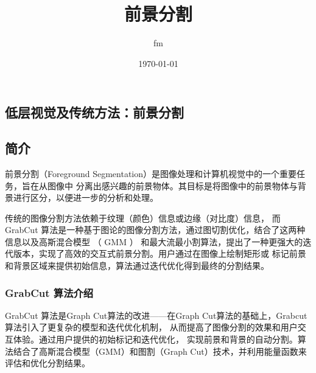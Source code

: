 \documentclass[12pt,a4paper]{article}
\date{\today}
\title{前景分割}
\author{fm}
\begin{document}
\begin{CJK}{UTF8}{gbsn}
\begin{sloppypar}
\maketitle
\section{低层视觉及传统方法：前景分割}
\subsection{简介}
前景分割（Foreground Segmentation）是图像处理和计算机视觉中的一个重要任务，旨在从图像中
分离出感兴趣的前景物体。其目标是将图像中的前景物体与背景进行区分，以便进一步的分析和处理。

传统的图像分割方法依赖于纹理（颜色）信息或边缘（对比度）信息，
而GrabCut 算法是一种基于图论的图像分割方法，通过图切割优化，结合了这两种信息以及高斯混合模型 （ GMM ） 
和最大流最小割算法，提出了一种更强大的迭代版本，实现了高效的交互式前景分割。用户通过在图像上绘制矩形或
标记前景和背景区域来提供初始信息，算法通过迭代优化得到最终的分割结果。
\subsubsection{GrabCut 算法介绍}
GrabCut 算法是Graph Cut算法的改进——在Graph Cut算法的基础上，Grabcut算法引入了更复杂的模型和迭代优化机制，
从而提高了图像分割的效果和用户交互体验。通过用户提供的初始标记和迭代优化，
实现前景和背景的自动分割。算法结合了高斯混合模型（GMM）和图割（Graph Cut）技术，并利用能量函数来评估和优化分割结果。


\end{sloppypar}
\end{CJK}
\end{document}
